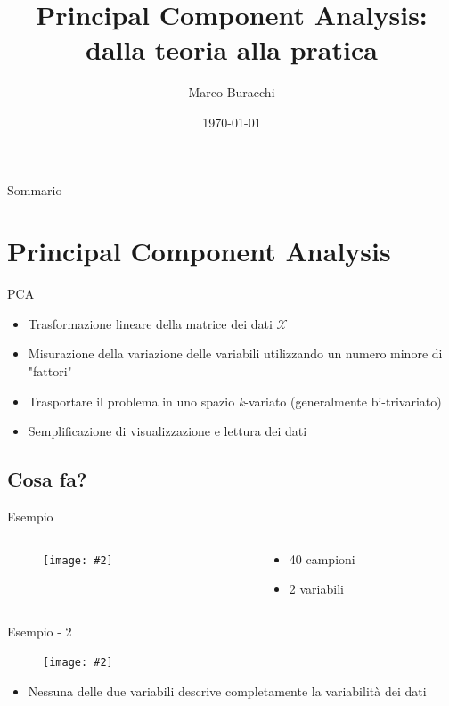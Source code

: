 \documentclass[xcolor={dvipsnames}]{beamer}%
\author{Marco Buracchi}
\title{Principal Component Analysis:\\ dalla teoria alla pratica}
\institute{Università degli studi di Firenze}
\date{\today}
\newcommand{\figcen}[2]{
	\begin{figure}
		\begin{center}
			\texttt{[image: \#2]}
		\end{center}
	\end{figure}
}
\begin{document}
\maketitle

\small

\begin{frame}{Sommario}

  \tableofcontents

\end{frame}

\section{Principal Component Analysis}

	\begin{frame}{PCA}
		\begin{itemize}
			\item Trasformazione lineare della matrice dei dati $\mathcal{X}$
			\item Misurazione della variazione delle variabili utilizzando un numero minore di "fattori"
			\item Trasportare il problema in uno spazio \emph{k}-variato (generalmente bi-trivariato)
			\item Semplificazione di visualizzazione e lettura dei dati
		\end{itemize}
	\end{frame}

	\subsection{Cosa fa?}
		\begin{frame}{Esempio}
			\begin{columns}
				\begin{column}{0.5\textwidth}
					\figcen{\columnwidth}{plotTeoria}
				\end{column}
				\begin{column}{0.5\textwidth}
					\begin{itemize}
						\item 40 campioni
						\item 2 variabili
					\end{itemize}
				\end{column}
			\end{columns}			
		\end{frame}
	
		\begin{frame}{Esempio - 2}
			\figcen{.8\textwidth}{proiezione}
			\begin{itemize}
				\item Nessuna delle due variabili descrive completamente la variabilità dei dati
			\end{itemize}
		\end{frame}
	
\end{document}
